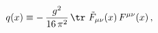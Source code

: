 \begin{equation}
q(x) \equiv - \,\frac{g^2}{16\, \pi^2}\, \tr\,\, \tilde F_{\mu\nu}(x)\, F^{\mu\nu}(x)\,,
\end{equation}

